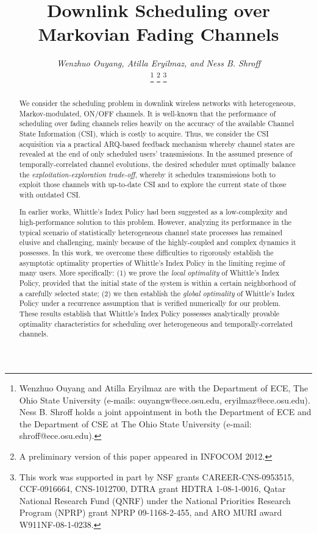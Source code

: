 \documentclass[11pt,twocolumn]{IEEEtran}
\begin{document}
\title{Downlink Scheduling over Markovian Fading Channels}

\author{\emph{Wenzhuo Ouyang, Atilla Eryilmaz, and Ness B.
Shroff}
\vspace{-9pt}

\vspace{-5pt}
\thanks{Wenzhuo Ouyang and Atilla Eryilmaz are with the Department of ECE, The Ohio State University (e-mails: ouyangw@ece.osu.edu, eryilmaz@ece.osu.edu).
Ness B. Shroff holds a joint appointment in both the Department of ECE and the Department of CSE at The Ohio State University (e-mail: shroff@ece.osu.edu). }
\thanks{A preliminary version of this paper appeared in INFOCOM 2012.}
\thanks{This work was supported in part by NSF grants CAREER-CNS-0953515, CCF-0916664, CNS-1012700, DTRA grant HDTRA 1-08-1-0016, Qatar National Research Fund (QNRF) under the National Priorities Research Program (NPRP) grant NPRP 09-1168-2-455, and ARO MURI award  W911NF-08-1-0238.}
}
\maketitle

\begin{abstract}
We consider the scheduling problem in downlink wireless
networks with heterogeneous, Markov-modulated, ON/OFF channels. It
is well-known that the performance of scheduling over fading
channels relies heavily on the accuracy of the available Channel
State Information (CSI), which is costly to acquire. Thus, we
consider the CSI acquisition via a practical ARQ-based feedback
mechanism whereby channel states are revealed at the end of only scheduled
users' transmissions. In the assumed presence of
temporally-correlated channel evolutions, the desired scheduler must
optimally balance the \emph{exploitation-exploration trade-off},
whereby it schedules transmissions both to exploit those channels
with up-to-date CSI and to explore the current state of those with
outdated CSI.

In earlier works, Whittle's Index Policy had been suggested as a
low-complexity and high-performance solution to this problem.
However, analyzing its performance in the typical scenario of
statistically heterogeneous channel state processes has remained
elusive and challenging, mainly because of the highly-coupled and
complex dynamics it possesses. In this work, we overcome these
difficulties to rigorously establish the asymptotic optimality
properties of Whittle's Index Policy in the limiting regime of
many users. More specifically: (1) we prove the \emph{local
optimality} of Whittle's Index Policy, provided that the
initial state of the system is within a certain neighborhood of a
carefully selected state; (2) we then establish the \emph{global
optimality} of Whittle's Index Policy under a recurrence assumption
that is verified numerically for our problem. These results
establish that Whittle's Index Policy possesses analytically provable optimality
characteristics for scheduling over heterogeneous and
temporally-correlated channels.
\end{abstract}
\end{document}

